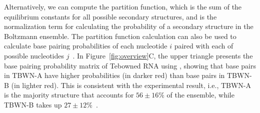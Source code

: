 Alternatively, we can compute the partition function, 
which is the sum of the equilibrium constants for all possible secondary structures,
and is the normalization term for calculating the probability of a secondary structure in the Boltzmann ensemble.
The partition function calculation can also be used to 
calculate base pairing probabilities of each nucleotide $i$ 
paired with each of possible nucleotides $j$~\cite{mccaskill:1990, mathews:2004}. 
In Figure~\ref{fig:overview}C,
the upper triangle presents the base pairing probability matrix of Tebowned RNA using \viennarnafold, 
showing that base pairs in TBWN-A have higher probabilities (in darker red) than
base pairs in TBWN-B (in lighter red).
This is consistent with the experimental result, i.e.,
TBWN-A is the majority structure that accounts for $56 \pm 16\%$ of the ensemble, 
while TBWN-B takes up $27 \pm 12\%$~\cite{Cordero+Das:2015}. %


